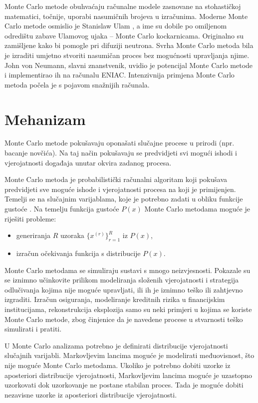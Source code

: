 Monte Carlo metode obuhvaćaju računalne modele zasnovane na stohastičkoj matematici, točnije, uporabi nasumičnih brojeva u izračunima. Moderne Monte Carlo metode osmislio je Stanislaw Ulam \citep{kass1998markov}, a ime su dobile po omiljenom odredištu zabave Ulamovog ujaka -- Monte Carlo kockarnicama. Originalno su zamišljene kako bi pomogle pri difuziji neutrona. Svrha Monte Carlo metoda bila je izraditi umjetno stvoriti nasumičan proces bez mogućnosti upravljanja njime. John von Neumann, slavni znanstvenik, uvidio je potencijal Monte Carlo metode i implementirao ih na računalu ENIAC. Intenzivnija primjena Monte Carlo metoda počela je s pojavom snažnijih računala. 

\section{Mehanizam}

Monte Carlo metode pokušavaju oponašati slučajne procese u prirodi (npr. bacanje novčića). Na taj način pokušavaju se predvidjeti svi mogući ishodi i vjerojatnosti događaja unutar okvira zadanog procesa. 

Monte Carlo metoda je probabilistički računalni algoritam koji pokušava predvidjeti sve moguće ishode i vjerojatnosti procesa na koji je primijenjen. Temelji se na slučajnim varijablama, koje je potrebno zadati u obliku funkcije gustoće \citep{gilks1996markov}. Na temelju funkcija gustoće $P(x)$ Monte Carlo metodama moguće je riješiti probleme:
\begin{itemize}
\item generiranja $R$ uzoraka $\{x^{(r)}\}_{r=1}^{R}$ iz $P(x)$,
\item izračun očekivanja funkcija s distribucije $P(x)$.
\end{itemize}


Monte Carlo metodama se simuliraju sustavi s mnogo neizvjesnosti. Pokazale su se iznimno učinkovite prilikom modeliranja složenih vjerojatnosti i strategija odlučivanja kojima nije moguće upravljati, ili ih je iznimno teško ili zahtjevno izgraditi. Izračun osiguranja, modeliranje kreditnih rizika u financijskim institucijama, rekonstrukcija eksplozija samo su neki primjeri u kojima se koriste Monte Carlo metode, zbog činjenice da je navedene procese u stvarnosti teško simulirati i pratiti. 

U Monte Carlo analizama potrebno je definirati distribucije vjerojatnosti slučajnih varijabli. Markovljevim lancima moguće je modelirati međuovisnost, što nije moguće Monte Carlo metodama. Ukoliko je potrebno dobiti uzorke iz aposteriori distribucije vjerojatnosti, Markovljevim lancima moguće je uzastopno uzorkovati dok uzorkovanje ne postane stabilan proces. Tada je moguće dobiti nezavisne uzorke iz aposteriori distribucije vjerojatnosti. 


